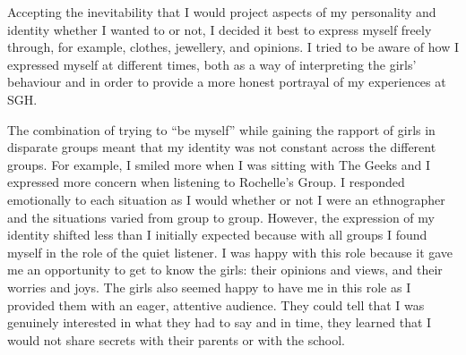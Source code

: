 Accepting the inevitability that I would project aspects of my personality and identity whether I wanted to or not, I decided it best to express myself freely through, for example, clothes, jewellery, and opinions.  I tried to be aware of how I expressed myself at different times, both as a way of interpreting the girls' behaviour and in order to provide a more honest portrayal of my experiences at SGH.  

The combination of trying to ``be myself'' while gaining the rapport of girls in disparate groups meant that my identity was not constant across the different groups.  For example, I smiled more when I was sitting with The Geeks and I expressed more concern when listening to Rochelle's Group.  I responded emotionally to each situation as I would whether or not I were an ethnographer and the situations varied from group to group.  However, the expression of my identity shifted less than I initially expected because with all groups I found myself in the role of the quiet listener.  I was happy with this role because it gave me an opportunity to get to know the girls: their opinions and views, and their worries and joys.  The girls also seemed happy to have me in this role as I provided them with an eager, attentive audience.  They could tell that I was genuinely interested in what they had to say and in time, they learned that I would not share secrets with their parents or with the school.

